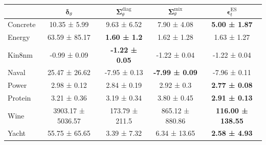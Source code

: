 \begin{tabular}{l|c|c|c|c}
\toprule
 & $\bm\delta_\theta$ & $\bm\Sigma_\theta^{\mathrm{diag}}$ & $\bm\Sigma_\theta^{\mathrm{mix}}$ & $\bm\epsilon_t^\mathrm{ES}$ \\
\midrule
Concrete & 10.35 ± 5.99 & 9.63 ± 6.52 & 7.90 ± 4.08 & \textbf{5.00 ± 1.87} \\
Energy & 63.59 ± 85.17 & \textbf{1.60 ± 1.2} & 1.62 ± 1.28 & 1.63 ± 1.27 \\
Kin8nm & -0.99 ± 0.09 & \textbf{-1.22 ± 0.05} & -1.22 ± 0.04 & -1.22 ± 0.04 \\
Naval & 25.47 ± 26.62 & -7.95 ± 0.13 & \textbf{-7.99 ± 0.09} & -7.96 ± 0.11 \\
Power & 2.98 ± 0.12 & 2.84 ± 0.19 & 2.92 ± 0.3 & \textbf{2.77 ± 0.08} \\
Protein & 3.21 ± 0.36 & 3.19 ± 0.34 & 3.80 ± 0.45 & \textbf{2.91 ± 0.13} \\
Wine & 3903.17 ± 5036.57 & 173.79 ± 211.5 & 865.12 ± 880.86 & \textbf{116.00 ± 138.55} \\
Yacht & 55.75 ± 65.65 & 3.39 ± 7.32 & 6.34 ± 13.65 & \textbf{2.58 ± 4.93} \\
\bottomrule
\end{tabular}
